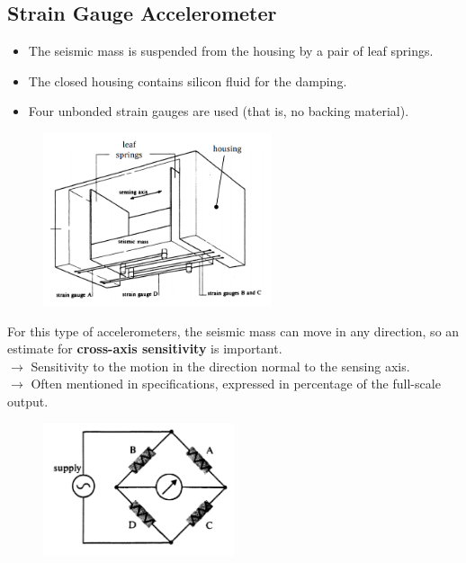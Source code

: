 \documentclass[class=report, crop=false, 12pt,a4paper]{standalone}
\begin{document}
\subsection{Strain Gauge Accelerometer}
\begin{itemize}
  \item The seismic mass is suspended from the housing by a pair of leaf springs.
  \item The closed housing contains silicon fluid for the damping.
  \item Four unbonded strain gauges are used (that is, no backing material).
\end{itemize}
\begin{figure}[H]
  \centering
  \includegraphics[width = 0.6\textwidth]{../img/Mdiagram33.png}
\end{figure}
For this type of accelerometers, the seismic mass can move in any direction, so an estimate for \textbf{cross-axis sensitivity} is important. \\
$\rightarrow$ Sensitivity to the motion in the direction normal to the sensing axis. \\
$\rightarrow$ Often mentioned in specifications, expressed in percentage of the full-scale output.
\begin{figure}[H]
  \centering
  \includegraphics[width = 0.5\textwidth]{../img/Mdiagram34.png}
\end{figure}
\end{document}
